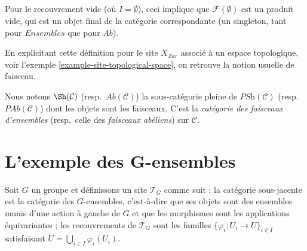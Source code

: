 \begin{remark}
\label{remark-empty-covering}
Pour le recouvrement vide (o\`u $I = \emptyset$), ceci implique que
$\mathcal{F}(\emptyset)$ est un produit vide, qui est un objet final de la
cat\'egorie correspondante (un singleton, tant pour $\textit{Ensembles}$ que pour
$\textit{Ab}$).
\end{remark}

\begin{example}
\label{example-sheaf-site-space}
En explicitant cette d\'efinition pour le site $X_{Zar}$ associ\'e \`a un espace
topologique, voir l'exemple \ref{example-site-topological-space}, on retrouve la notion usuelle
de faisceau.
\end{example}

\begin{definition}
\label{definition-category-sheaves}
Nous notons $\Sh(\mathcal{C})$ (resp.\ $\textit{Ab}(\mathcal{C})$)
la sous-cat\'egorie pleine de $\textit{PSh}(\mathcal{C})$
(resp.\ $\textit{PAb}(\mathcal{C})$) dont les objets sont les faisceaux. C'est la
{\it cat\'egorie des faisceaux d'ensembles} (resp.\ celle des {\it faisceaux ab\'eliens}) sur
$\mathcal{C}$.
\end{definition}




\section{L'exemple des G-ensembles}
\label{section-G-sets}

\noindent
Soit $G$ un groupe et d\'efinissons un site $\mathcal{T}_G$ comme suit : la cat\'egorie
sous-jacente est la cat\'egorie des $G$-ensembles, c'est-\`a-dire que ses objets sont des ensembles munis
d'une action \`a gauche de $G$ et que les morphismes sont les applications \'equivariantes ; les
recouvrements de $\mathcal{T}_G$ sont les familles
$\{\varphi_i : U_i \to U\}_{i\in I}$ satisfaisant
$U = \bigcup_{i\in I} \varphi_i(U_i)$.

